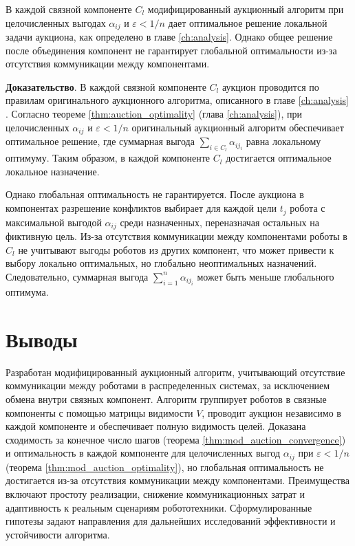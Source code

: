 \begin{theorem}
\label{thm:mod_auction_optimality}
В каждой связной компоненте \( C_l \) модифицированный аукционный алгоритм при целочисленных выгодах \( \alpha_{ij} \) и \( \varepsilon < 1/n \) дает оптимальное решение локальной задачи аукциона, как определено в главе \ref{ch:analysis}. Однако общее решение после объединения компонент не гарантирует глобальной оптимальности из-за отсутствия коммуникации между компонентами.
\end{theorem}

\textbf{Доказательство}. 
В каждой связной компоненте \( C_l \) аукцион проводится по правилам оригинального аукционного алгоритма, описанного в главе \ref{ch:analysis} \cite{bertsekas1990}. Согласно теореме \ref{thm:auction_optimality} (глава \ref{ch:analysis}), при целочисленных \( \alpha_{ij} \) и \( \varepsilon < 1/n \) оригинальный аукционный алгоритм обеспечивает оптимальное решение, где суммарная выгода \( \sum_{i \in C_l} \alpha_{i j_i} \) равна локальному оптимуму. Таким образом, в каждой компоненте \( C_l \) достигается оптимальное локальное назначение. 

Однако глобальная оптимальность не гарантируется. После аукциона в компонентах разрешение конфликтов выбирает для каждой цели \( t_j \) робота с максимальной выгодой \( \alpha_{ij} \) среди назначенных, переназначая остальных на фиктивную цель. Из-за отсутствия коммуникации между компонентами роботы в \( C_l \) не учитывают выгоды роботов из других компонент, что может привести к выбору локально оптимальных, но глобально неоптимальных назначений. Следовательно, суммарная выгода \( \sum_{i=1}^n \alpha_{i j_i} \) может быть меньше глобального оптимума.


\section{Выводы}

Разработан модифицированный аукционный алгоритм, учитывающий отсутствие коммуникации между роботами в распределенных системах, за исключением обмена внутри связных компонент. Алгоритм группирует роботов в связные компоненты с помощью матрицы видимости \( V \), проводит аукцион независимо в каждой компоненте и обеспечивает полную видимость целей. Доказана сходимость за конечное число шагов (теорема \ref{thm:mod_auction_convergence}) и оптимальность в каждой компоненте для целочисленных выгод \( \alpha_{ij} \) при \( \varepsilon < 1/n \) (теорема \ref{thm:mod_auction_optimality}), но глобальная оптимальность не достигается из-за отсутствия коммуникации между компонентами. Преимущества включают простоту реализации, снижение коммуникационных затрат и адаптивность к реальным сценариям робототехники. Сформулированные гипотезы задают направления для дальнейших исследований эффективности и устойчивости алгоритма.
